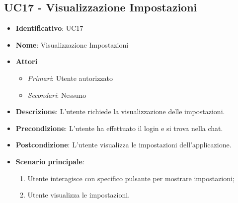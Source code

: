 \subsection{UC17 - Visualizzazione Impostazioni}
\begin{itemize}
	\item \textbf{Identificativo}: UC17
	\item \textbf{Nome}: Visualizzazione Impostazioni
	\item \textbf{Attori}
	\begin{itemize} 
		\item \textit{Primari}: Utente autorizzato
		\item \textit{Secondari}: Nessuno
	\end{itemize}
	\item \textbf{Descrizione}: L'utente richiede la visualizzazione delle impostazioni.
	\item \textbf{Precondizione}: L'utente ha effettuato il login e si trova nella chat.
	\item \textbf{Postcondizione}: L'utente visualizza le impostazioni dell'applicazione.
	\item \textbf{Scenario principale}: \begin{enumerate}
		\item Utente interagisce con specifico pulsante per mostrare impostazioni;
		\item Utente visualizza le impostazioni.
	\end{enumerate}
\end{itemize}